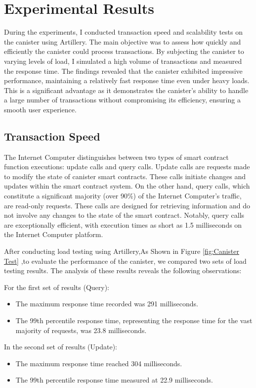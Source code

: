 \chapter{Experimental Results}
\label{chap:todo}
During the experiments, I conducted transaction speed and scalability tests on the canister using Artillery. The main objective was to assess how quickly and efficiently the canister could process transactions. By subjecting the canister to varying levels of load, I simulated a high volume of transactions and measured the response time. The findings revealed that the canister exhibited impressive performance, maintaining a relatively fast response time even under heavy loads. This is a significant advantage as it demonstrates the canister's ability to handle a large number of transactions without compromising its efficiency, ensuring a smooth user experience.
\section{Transaction Speed}
The Internet Computer distinguishes between two types of smart contract function executions: update calls and query calls.
Update calls are requests made to modify the state of canister smart contracts. These calls initiate changes and updates within the smart contract system.
On the other hand, query calls, which constitute a significant majority (over 90\%) of the Internet Computer's traffic, are read-only requests. These calls are designed for retrieving information and do not involve any changes to the state of the smart contract. Notably, query calls are exceptionally efficient, with execution times as short as 1.5 milliseconds on the Internet Computer platform.


After conducting load testing using Artillery,As Shown in Figure \ref{fig:Canister Test} ,to evaluate the performance of the canister, we compared two sets of load testing results. The analysis of these results reveals the following observations:

For the first set of results (Query):
\begin{itemize}
    \item The maximum response time recorded was 291 milliseconds.
    \item  The 99th percentile response time, representing the response time for the vast majority of requests, was 23.8 milliseconds.
\end{itemize}

In the second set of results (Update):
\begin{itemize}
    \item The maximum response time reached 304 milliseconds.
    \item The 99th percentile response time measured at 22.9 milliseconds.
\end{itemize}

